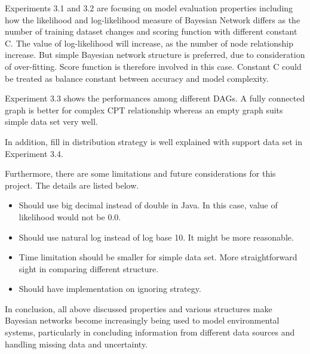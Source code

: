 \documentclass{article}
\begin{document}
Experiments 3.1 and 3.2 are focusing on model evaluation properties including how the likelihood and log-likelihood measure of Bayesian Network differs as the number of training dataset changes and scoring function with different constant C. The value of log-likelihood will increase, as the number of node relationship increase. But simple Bayesian network structure is preferred, due to consideration of over-fitting. Score function is therefore involved in this case. Constant C could be treated as balance constant between accuracy and model complexity.

Experiment 3.3 shows the performances among different DAGs. A fully connected graph is better for complex CPT relationship whereas an empty graph suits simple data set very well.

In addition, fill in distribution strategy is well explained with support data set in Experiment 3.4.
 
Furthermore, there are some limitations and future considerations for this project. The details are listed below.
\begin{itemize}
\item Should use big decimal instead of double in Java. In this case, value of likelihood would not be 0.0.
\item Should use natural log instead of log base 10. It might be more reasonable.
\item Time limitation should be smaller for simple data set. More straightforward sight in comparing different structure.
\item Should have implementation on ignoring strategy. 
\end{itemize}

In conclusion, all above discussed properties and various structures make Bayesian networks become increasingly being used to model environmental systems, particularly in concluding information from different data sources and handling missing data and uncertainty.




\end{document}
